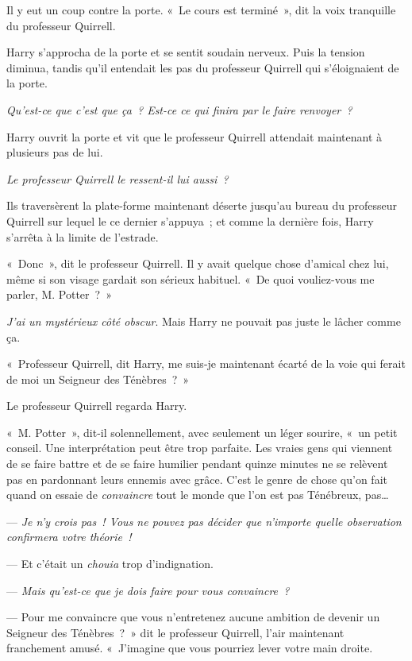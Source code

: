 Il y eut un coup contre la porte.
«~Le cours est terminé~», dit la voix tranquille du professeur Quirrell.

Harry s'approcha de la porte et se sentit soudain nerveux.
Puis la tension diminua, tandis qu'il entendait les pas du professeur Quirrell qui s'éloignaient de la porte.

\emph{Qu'est-ce que c'est que ça~?
Est-ce ce qui finira par le faire renvoyer~?}

Harry ouvrit la porte et vit que le professeur Quirrell attendait maintenant à plusieurs pas de lui.

\emph{Le professeur Quirrell le ressent-il lui aussi~?}

Ils traversèrent la plate-forme maintenant déserte jusqu'au bureau du professeur Quirrell sur lequel le ce dernier s'appuya~; et comme la dernière fois, Harry s'arrêta à la limite de l'estrade.

«~Donc~», dit le professeur Quirrell.
Il y avait quelque chose d'amical chez lui, même si son visage gardait son sérieux habituel.
«~De quoi vouliez-vous me parler, M. Potter~?~»

\emph{J'ai un mystérieux côté obscur}.
Mais Harry ne pouvait pas juste le lâcher comme ça.

«~Professeur Quirrell, dit Harry, me suis-je maintenant écarté de la voie qui ferait de moi un Seigneur des Ténèbres~?~»

Le professeur Quirrell regarda Harry.

«~M. Potter~», dit-il solennellement, avec seulement un léger sourire, «~un petit conseil.
Une interprétation peut être trop parfaite.
Les vraies gens qui viennent de se faire battre et de se faire humilier pendant quinze minutes ne se relèvent pas en pardonnant leurs ennemis avec grâce.
C'est le genre de chose qu'on fait quand on essaie de \emph{convaincre} tout le monde que l'on est pas Ténébreux, pas…

--- \emph{Je n'y crois pas~!
Vous ne pouvez pas décider que n'importe quelle observation confirmera votre théorie~!}

--- Et c'était un \emph{chouia} trop d'indignation.

--- \emph{Mais qu'est-ce que je dois faire pour vous convaincre~?}

--- Pour me convaincre que vous n'entretenez aucune ambition de devenir un Seigneur des Ténèbres~?~»
dit le professeur Quirrell, l'air maintenant franchement amusé.
«~J'imagine que vous pourriez lever votre main droite.

